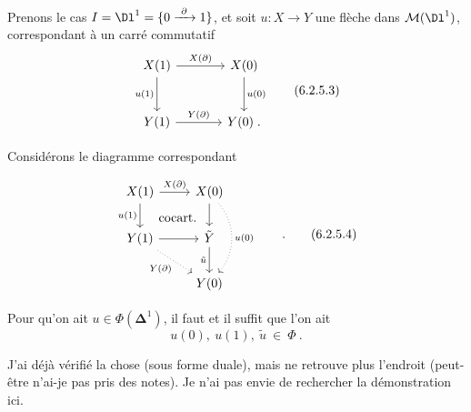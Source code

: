Prenons le cas $I = \Dl^1 = \{0 \xrightarrow{\ \partial\ } 1\}$, et soit $u : X \longrightarrow Y$ une flèche dans $\mathcal{M}(\Dl^1)$, correspondant à un carré commutatif
\[
\begin{tikzcd}[row sep=large, column sep=large]
X(1) \arrow[r, "X(\partial)"] \arrow[d, "u(1)"'] & X(0) \arrow[d, "u(0)"] \\
Y(1) \arrow[r, "Y(\partial)"] & Y(0)\;.
\end{tikzcd}
\tag*{(6.2.5.3)}
\]

Considérons le diagramme correspondant

\noindent{}
\[
\begin{tikzcd}
X(1) \arrow[r, "X(\partial)"] \arrow[d, "u(1)"'] \arrow[dr, phantom, "\text{cocart.}"] & X(0) \arrow[d] \arrow[dd, dotted, bend left=40, "u(0)"] \\
Y(1) \arrow[r] \arrow[dr, dotted, "Y(\partial)"'] & \tilde{Y} \arrow[d, "\tilde{u}"'] \\
 & Y(0)
\end{tikzcd}
\qquad .
\tag*{(6.2.5.4)}
\]

Pour qu'on ait $u \in \Phi(\boldsymbol{\Delta}^1)$, il faut et il suffit que l'on ait
\[
u(0),\ u(1),\ \tilde{u} \ \in\ \Phi\ .
\tag*{(6.2.5.5)}
\]

J'ai déjà vérifié la chose (sous forme duale), mais ne retrouve plus l'endroit (peut-être n'ai-je pas pris des notes). Je n'ai pas envie de rechercher la démonstration ici.

